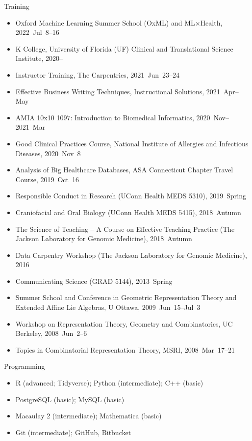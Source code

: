 \documentclass[10pt,a4paper]{article}
\begin{document}
\vspace{.25cm}
{\sc Training}
\begin{itemize}[label=$\circ$,nolistsep]
\item
Oxford Machine Learning Summer School (OxML) and ML$\times$Health, 2022~Jul~8--16
\item
K College, University of Florida (UF) Clinical and Translational Science Institute, 2020--
\item
Instructor Training, The Carpentries, 2021~Jun~23--24
\item
Effective Business Writing Techniques, Instructional Solutions, 2021~Apr--May
\item
AMIA 10x10 1097: Introduction to Biomedical Informatics, 2020~Nov--2021~Mar
\item
Good Clinical Practices Course, National Institute of Allergies and Infectious Diseases, 2020~Nov~8
\item
Analysis of Big Healthcare Databases, ASA Connecticut Chapter Travel Course, 2019~Oct~16
\item
Responsible Conduct in Research (UConn Health MEDS 5310), 2019~Spring
\item
Craniofacial and Oral Biology (UConn Health MEDS 5415), 2018~Autumn
\item
The Science of Teaching -- A Course on Effective Teaching Practice (The Jackson Laboratory for Genomic Medicine), 2018~Autumn
\item
Data Carpentry Workshop (The Jackson Laboratory for Genomic Medicine), 2016
\item
Communicating Science (GRAD 5144), 2013~Spring
\item
Summer School and Conference in Geometric Representation Theory and Extended Affine Lie Algebras, U Ottawa, 2009~Jun~15--Jul~3
\item
Workshop on Representation Theory, Geometry and Combinatorics, UC Berkeley, 2008~Jun~2--6
\item
Topics in Combinatorial Representation Theory, MSRI, 2008~Mar~17--21
\end{itemize}
%
\vspace{.25cm}
{\sc Programming}
\begin{itemize}[label=$\circ$,nolistsep]
\item R (advanced; Tidyverse); Python (intermediate); C++ (basic)
\item PostgreSQL (basic); MySQL (basic)
\item Macaulay 2 (intermediate); Mathematica (basic)
\item Git (intermediate); GitHub, Bitbucket
\end{itemize}
\end{document}
